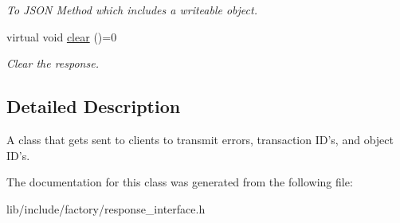 \begin{DoxyCompactItemize}
\begin{DoxyCompactList}\small\item\em To J\-S\-O\-N Method which includes a writeable object. \end{DoxyCompactList}\item 
\hypertarget{classApplicationResponseInterface_a385e375598ea18365ddb21ca5f9a1994}{virtual void \hyperlink{classApplicationResponseInterface_a385e375598ea18365ddb21ca5f9a1994}{clear} ()=0}\label{classApplicationResponseInterface_a385e375598ea18365ddb21ca5f9a1994}

\begin{DoxyCompactList}\small\item\em Clear the response. \end{DoxyCompactList}\end{DoxyCompactItemize}


\subsection{Detailed Description}
A class that gets sent to clients to transmit errors, transaction I\-D's, and object I\-D's. 

The documentation for this class was generated from the following file\-:\begin{DoxyCompactItemize}
\item 
lib/include/factory/response\-\_\-interface.\-h\end{DoxyCompactItemize}
